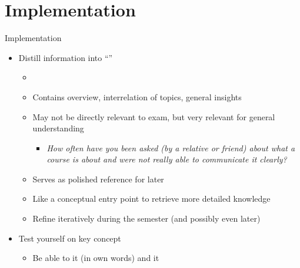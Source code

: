 \documentclass{ercisbeamer}
\begin{document}
\section{Implementation}
\begin{frame}{Implementation}
    \begin{tbox}
        \begin{itemize}
            \item Distill information into ``''
            \begin{itemize}
                \item {}
                \item Contains overview, interrelation of topics, general insights
                \item May not be directly relevant to exam, but very relevant for general understanding
                \begin{itemize}
                    \item \emph{How often have you been asked (by a relative or friend) about what a course is about and were not really able to communicate it clearly?}
                \end{itemize}
                \item Serves as polished reference for later
                \item Like a conceptual entry point to retrieve more detailed knowledge
                \item Refine iteratively during the semester (and possibly even later)
            \end{itemize}
            \item Test yourself on key concept
            \begin{itemize}
                \item Be able to  it (in own words) and  it
            \end{itemize}
        \end{itemize}
    \end{tbox}
\end{frame}
\setbgimage{}
\end{document}
